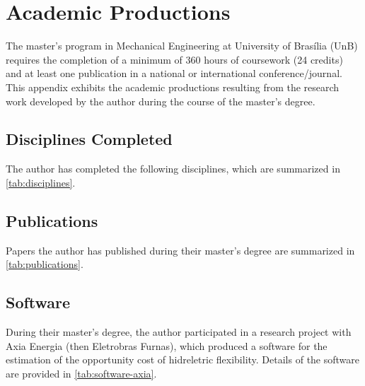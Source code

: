 \chapter{Academic Productions}
\label{chap:academic-productions}

The master's program in Mechanical Engineering at University of Brasília (UnB) requires 
the completion of a minimum of 360 hours of coursework (24 credits)
and at least one publication in a national or international conference/journal.
%
This appendix exhibits the academic productions resulting from the research work 
developed by the author during the course of the master's degree.

\section{Disciplines Completed}
\label{sec:disciplines-completed}
The author has completed the following disciplines,
which are summarized in \cref{tab:disciplines}.
%
\begin{table}[htbp]
    \centering
\end{table}

\section{Publications}
\label{sec:publications}

Papers the author has published during their master's degree are 
summarized in \cref{tab:publications}.
%
\begin{table}[htbp]
    \centering
\end{table}

\section{Software}
\label{sec:software}
During their master's degree, the author participated in a research project with Axia Energia (then Eletrobras Furnas), 
which produced a software for the estimation of the opportunity cost of hidreletric flexibility.
Details of the software are provided in \cref{tab:software-axia}.
%
\begin{table}[htbp]
    \centering
\end{table}